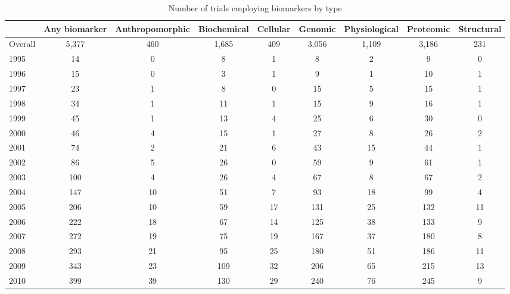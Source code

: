 \begin{table}[htbp]\centering
\caption{Number of trials employing biomarkers by type}
\begin{tabular}{l*{8}{c}}
\hline\hline
          &Any biomarker&Anthropomorphic&Biochemical& Cellular&  Genomic&Physiological&Proteomic&Structural\\
\hline
Overall   &    5,377&      460&    1,685&      409&    3,056&    1,109&    3,186&      231\\
1995      &       14&        0&        8&        1&        8&        2&        9&        0\\
1996      &       15&        0&        3&        1&        9&        1&       10&        1\\
1997      &       23&        1&        8&        0&       15&        5&       15&        1\\
1998      &       34&        1&       11&        1&       15&        9&       16&        1\\
1999      &       45&        1&       13&        4&       25&        6&       30&        0\\
2000      &       46&        4&       15&        1&       27&        8&       26&        2\\
2001      &       74&        2&       21&        6&       43&       15&       44&        1\\
2002      &       86&        5&       26&        0&       59&        9&       61&        1\\
2003      &      100&        4&       26&        4&       67&        8&       67&        2\\
2004      &      147&       10&       51&        7&       93&       18&       99&        4\\
2005      &      206&       10&       59&       17&      131&       25&      132&       11\\
2006      &      222&       18&       67&       14&      125&       38&      133&        9\\
2007      &      272&       19&       75&       19&      167&       37&      180&        8\\
2008      &      293&       21&       95&       25&      180&       51&      186&       11\\
2009      &      343&       23&      109&       32&      206&       65&      215&       13\\
2010      &      399&       39&      130&       29&      240&       76&      245&        9\\

\end{tabular}
\end{table}
